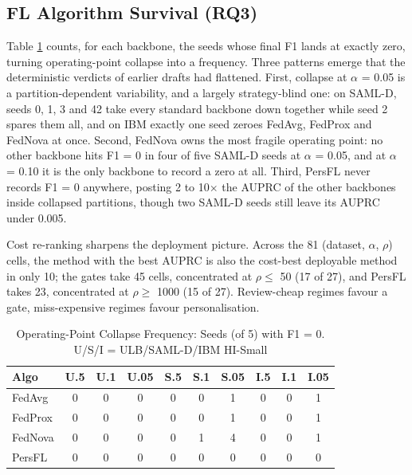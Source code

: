 \documentclass[a4paper, 10pt, conference]{ieeeconf}
\begin{document}
\subsection{FL Algorithm Survival (RQ3)}
Table \ref{tab:survival} counts, for each backbone, the seeds whose final F1
lands at exactly zero, turning operating-point collapse into a frequency. Three
patterns emerge that the deterministic verdicts of earlier drafts had flattened.
First, collapse at $\alpha$ = 0.05 is a partition-dependent variability, and a
largely strategy-blind one: on SAML-D, seeds 0, 1, 3 and 42 take every standard
backbone down together while seed 2 spares them all, and on IBM exactly one seed
zeroes FedAvg, FedProx and FedNova at once. Second, FedNova owns the most
fragile operating point: no other backbone hits F1 = 0 in four of five SAML-D
seeds at $\alpha$ = 0.05, and at $\alpha$ = 0.10 it is the only backbone to
record a zero at all. Third, PersFL never records F1 = 0 anywhere, posting 2 to
10$\times$ the AUPRC of the other backbones inside collapsed partitions, though
two SAML-D seeds still leave its AUPRC under 0.005.

Cost re-ranking sharpens the deployment picture. Across the 81
(dataset, $\alpha$, $\rho$) cells, the method with the best AUPRC is also the
cost-best deployable method in only 10; the gates take 45 cells, concentrated at
$\rho \le$ 50 (17 of 27), and PersFL takes 23, concentrated at $\rho \ge$ 1000
(15 of 27). Review-cheap regimes favour a gate, miss-expensive regimes favour
personalisation.

\begin{table}[!tb]
\caption{Operating-Point Collapse Frequency: Seeds (of 5) with F1 = 0. U/S/I = ULB/SAML-D/IBM HI-Small}\label{tab:survival}
\centering\scriptsize
\setlength{\tabcolsep}{4.2pt}
\begin{tabular}{@{}lccccccccc@{}}
\hline
\textbf{Algo} & \textbf{U.5} & \textbf{U.1} & \textbf{U.05} & \textbf{S.5} & \textbf{S.1} & \textbf{S.05} & \textbf{I.5} & \textbf{I.1} & \textbf{I.05} \\ \hline
FedAvg & 0 & 0 & 0 & 0 & 0 & 1 & 0 & 0 & 1 \\
FedProx & 0 & 0 & 0 & 0 & 0 & 1 & 0 & 0 & 1 \\
FedNova & 0 & 0 & 0 & 0 & 1 & 4 & 0 & 0 & 1 \\
PersFL & 0 & 0 & 0 & 0 & 0 & 0 & 0 & 0 & 0 \\ \hline
\end{tabular}
\end{table}
\end{document}
